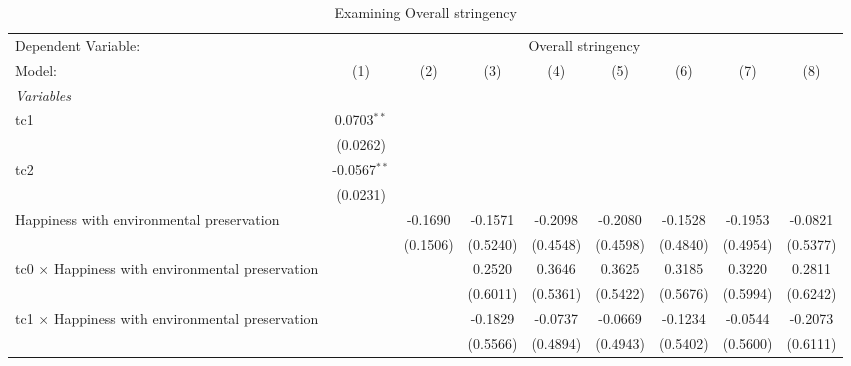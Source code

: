 
\begin{table}[htbp]
   \caption{Examining Overall stringency}
   \centering
   \begin{tabular}{lcccccccc}
      \tabularnewline \midrule \midrule
      Dependent Variable: & \multicolumn{8}{c}{Overall stringency}\\
      Model:                                                  & (1)            & (2)      & (3)      & (4)           & (5)           & (6)           & (7)           & (8)\\  
      \midrule
      \emph{Variables}\\
      tc1                                                     & 0.0703$^{**}$  &          &          &               &               &               &               &   \\   
                                                              & (0.0262)       &          &          &               &               &               &               &   \\   
      tc2                                                     & -0.0567$^{**}$ &          &          &               &               &               &               &   \\   
                                                              & (0.0231)       &          &          &               &               &               &               &   \\   
      Happiness with environmental preservation               &                & -0.1690  & -0.1571  & -0.2098       & -0.2080       & -0.1528       & -0.1953       & -0.0821\\   
                                                              &                & (0.1506) & (0.5240) & (0.4548)      & (0.4598)      & (0.4840)      & (0.4954)      & (0.5377)\\   
      tc0 $\times$ Happiness with environmental preservation  &                &          & 0.2520   & 0.3646        & 0.3625        & 0.3185        & 0.3220        & 0.2811\\   
                                                              &                &          & (0.6011) & (0.5361)      & (0.5422)      & (0.5676)      & (0.5994)      & (0.6242)\\   
      tc1 $\times$ Happiness with environmental preservation  &                &          & -0.1829  & -0.0737       & -0.0669       & -0.1234       & -0.0544       & -0.2073\\   
                                                              &                &          & (0.5566) & (0.4894)      & (0.4943)      & (0.5402)      & (0.5600)      & (0.6111)\\   

\end{tabular}
\end{table}
